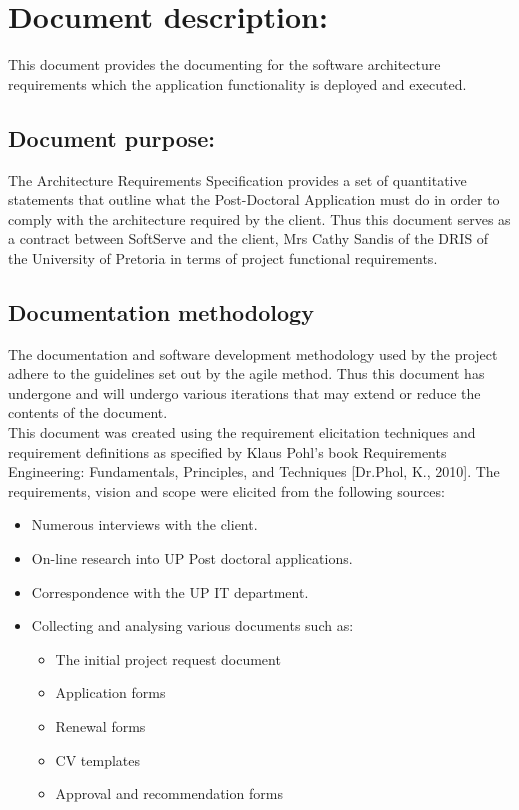 \documentclass[12pt]{article}
\begin{document}
\listoffigures
\newpage
\section{Document description:}
This document provides the documenting for the software architecture requirements which the application functionality is deployed and executed.


\subsection{Document purpose:}
\vspace{0.2in}
The Architecture Requirements Specification provides a set of quantitative statements that outline what the Post-Doctoral Application must do in order to comply with the architecture required by the client. Thus this document serves as a contract between SoftServe and the client, Mrs Cathy Sandis of the DRIS of the University of Pretoria in terms of project functional requirements.

\vspace{0.2in}

\subsection{Documentation methodology}
\vspace{0.2in}
\begin{flushleft}
The documentation and software development methodology used by the project adhere to the guidelines set out by the agile method. Thus this document has undergone and will undergo various iterations that may extend or reduce the contents of the document.\\

This document was created using the requirement elicitation techniques and requirement definitions as specified by Klaus Pohl’s book Requirements Engineering: Fundamentals, Principles, and Techniques [Dr.Phol, K., 2010].
The requirements, vision and scope were elicited from the following sources:
\begin{itemize}
	\item Numerous interviews with the client.
	\item On-line research into UP Post doctoral applications.
	\item Correspondence with the UP IT department.
	\item Collecting and analysing various documents such as:
		\begin{itemize}
			\item The initial project request document
			\item Application forms
			\item Renewal forms
			\item CV templates
			\item Approval and recommendation forms
		\end{itemize}
\end{itemize}
\end{flushleft}	
\end{document}
